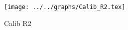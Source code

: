 \begin{figure}[h] \centering\texttt{[image: ../../graphs/Calib\_R2.tex]}\caption{Calib R2}\label{gr:Calib_R2} \end{figure}
